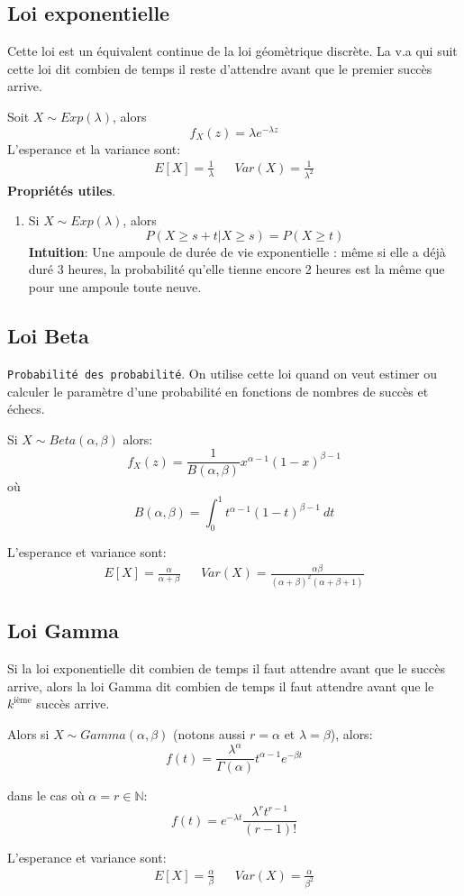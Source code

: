 \documentclass[a4paper]{article}
\newcommand{\N}{\mathbb{N}}
\begin{document}
\subsection{Loi exponentielle}
Cette loi est un équivalent continue de la loi géomètrique discrète.
La v.a qui suit cette loi dit combien de temps il reste d'attendre avant que le
premier succès arrive.

Soit $X \sim Exp(\lambda)$, alors
 \[
     f_X(z) = \lambda e^{-\lambda z}
\] 
L'esperance et la variance sont:
\begin{align*}
    E[X] = \frac{1}{\lambda} & & Var(X) = \frac{1}{\lambda^2}
\end{align*}
\textbf{Propriétés utiles}.
\begin{enumerate}
    \item Si $X \sim Exp(\lambda)$, alors
         \[
        P(X \ge s + t | X \ge s) = P(X \ge t)
        \] 
        \textbf{Intuition}: Une ampoule de durée de vie exponentielle :
        même si elle a déjà duré 3 heures, la probabilité qu’elle tienne
        encore 2 heures est la même que pour une ampoule toute neuve.
\end{enumerate}

\subsection{Loi Beta}
\texttt{Probabilité des probabilité}. On utilise cette loi quand on veut
estimer ou calculer le paramètre d'une probabilité en fonctions de nombres de
succès et échecs.

Si $X \sim Beta(\alpha, \beta)$ alors:
\[
    f_X(z) = \frac{1}{B(\alpha, \beta)}x^{\alpha-1}(1 - x)^{\beta - 1}
\] 
où
\[
    B(\alpha, \beta) = \int_{{0}}^{{1}} {t^{\alpha-1} (1-t)^{\beta - 1}} \: d{t} {}
\] 

L'esperance et variance sont:
 \begin{align*}
     E[X] = \frac{\alpha}{\alpha + \beta} & & Var(X) = \frac{\alpha \beta}{(\alpha + \beta)^2 (\alpha + \beta + 1)}
\end{align*}

\subsection{Loi Gamma}
Si la loi exponentielle dit combien de temps il faut attendre avant que le
succès arrive, alors la loi Gamma dit combien de temps il faut attendre avant
que le $k^{\text{ième}}$ succès arrive.

Alors si $X \sim Gamma(\alpha, \beta)$ (notons aussi $r = \alpha$ et  $\lambda = \beta$), alors:
\[
    f(t) = \frac{\lambda^{\alpha}}{\Gamma(\alpha)}t^{\alpha-1}e^{-\beta t}
\] 

dans le cas où $\alpha = r \in \N$:
\[
    f(t) = e^{-\lambda t} \frac{\lambda^r t^{r-1}}{(r-1)!}
\] 

L'esperance et variance sont:
\begin{align*}
    E[X] = \frac{\alpha}{\beta} & & Var(X) = \frac{\alpha}{\beta^2}
\end{align*}
\end{document}
